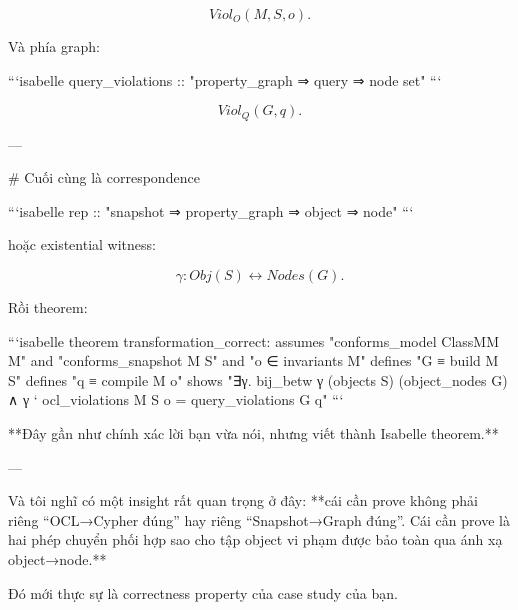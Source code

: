 $$
Viol_O(M,S,o).
$$

Và phía graph:

```isabelle
query_violations ::
  "property_graph ⇒ query ⇒ node set"
```

$$
Viol_Q(G,q).
$$

---

# Cuối cùng là correspondence

```isabelle
rep ::
  "snapshot ⇒ property_graph ⇒ object ⇒ node"
```

hoặc existential witness:

$$
\gamma:Obj(S)\leftrightarrow Nodes(G).
$$

Rồi theorem:

```isabelle
theorem transformation_correct:
  assumes "conforms_model ClassMM M"
      and "conforms_snapshot M S"
      and "o ∈ invariants M"
  defines "G ≡ build M S"
  defines "q ≡ compile M o"
  shows
    "∃γ.
       bij_betw γ (objects S) (object_nodes G)
       ∧ γ ` ocl_violations M S o
         = query_violations G q"
```

**Đây gần như chính xác lời bạn vừa nói, nhưng viết thành Isabelle theorem.**

---

Và tôi nghĩ có một insight rất quan trọng ở đây: **cái cần prove không phải riêng “OCL→Cypher đúng” hay riêng “Snapshot→Graph đúng”. Cái cần prove là hai phép chuyển phối hợp sao cho tập object vi phạm được bảo toàn qua ánh xạ object→node.**

Đó mới thực sự là correctness property của case study của bạn.
